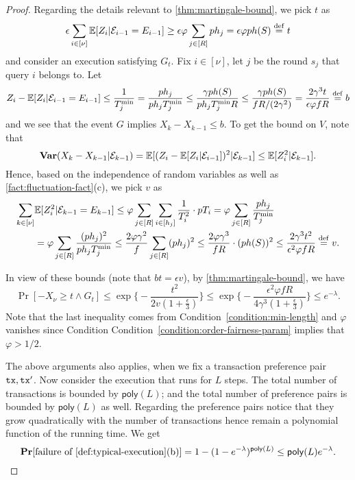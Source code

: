 \begin{proof}
    Regarding the details relevant to \cref{thm:martingale-bound}, we pick $t$ as
    \[ \epsilon \sum_{i \in [\nu]} \mathbb{E} [Z_i | \mathcal{E}_{i - 1} = E_{i - 1}] \ge \epsilon \varphi \sum_{j \in [R]} p h_j = \epsilon \varphi p h(S) \overset{\mathrm{def}}{=} t \]
    and consider an execution satisfying $G_t$.
    Fix $i \in [\nu]$, let $j$ be the round $s_j$ that query $i$ belongs to.
    Let
    \[ Z_i - \mathbb{E} [Z_i | \mathcal{E}_{i - 1} = E_{i - 1}] \le \frac{1}{T^{\min}_j} = \frac{p h_j}{p h_j T^{\min}_j} \le \frac{\gamma p h(S)}{p h_j T^{\min}_j R} \le \frac{\gamma p h(S)}{fR / (2\gamma^2)} = \frac{2\gamma^3 t}{\epsilon \varphi f R} \overset{\mathrm{def}}{=} b \]
    and we see that the event $G$ implies $X_k - X_{k - 1} \le b$.
    To get the bound on $V$, note that
    \[  \mathbf{Var} (X_k - X_{k - 1} | \mathcal{E}_{k - 1}) = \mathbb{E}[(Z_i - \mathbb{E} [Z_i | \mathcal{E}_{i - 1}])^2 | \mathcal{E}_{k - 1}] \le \mathbb{E} [Z^2_i | \mathcal{E}_{k  -1}]. \]
    Hence, based on the independence of random variables as well as \cref{fact:fluctuation-fact}(c), we pick $v$ as
    \begin{align*}
        \sum_{k \in [\nu]} & \mathbb{E} [Z^2_i | \mathcal{E}_{k - 1} = E_{k - 1}] \le \varphi \sum_{j \in [R]} \sum_{i \in [h_j]} \frac{1}{T_i^2} \cdot p T_i
        = \varphi \sum_{j \in [R]} \frac{p h_j}{T^{\min}_j}
        \\
                           & = \varphi \sum_{j \in [R]} \frac{(p h_j)^2}{p h_j T^{\min}_j}  \le \frac{2\varphi \gamma^2}{f} \sum_{j \in [R]} (p h_j)^2 \le \frac{2\varphi \gamma^3}{f R} \cdot (p h(S))^2 \le
        \frac{2 \gamma^3 t^2}{\epsilon^2 \varphi f R} \overset{\mathrm{def}}{=} v.
    \end{align*}

    In view of these bounds (note that $bt = \epsilon v$), by \cref{thm:martingale-bound}, we have
    \[ \Pr [-X_\nu \ge t \wedge G_t] \le \exp \Big\{ -\frac{t^2}{2v (1 + \frac{\epsilon}{3})} \Big\} \le \exp \Big\{ -\frac{\epsilon^2 \varphi f R}{4\gamma^3 (1 + \frac{\epsilon}{3})} \Big\} \le e^{-\lambda}. \]
    Note that the last inequality comes from Condition~\eqref{condition:min-length} and $\varphi$ vanishes since Condition Condition~\eqref{condition:order-fairness-param} implies that $\varphi > 1/2$.

    The above arguments also applies, when we fix a transaction preference pair $\mathtt{tx}, \mathtt{tx}'$.
    Now consider the execution that runs for $L$ steps.
    The total number of transactions is bounded by $\mathsf{poly}(L)$; and the total number of preference pairs is bounded by $\mathsf{poly}(L)$ as well.
    Regarding the preference pairs notice that they grow quadratically with the number of transactions hence remain a polynomial function of the running time.
    We get
    \begin{equation} \label{eq:error-prob-ds-lower-bound}
        \Pr[\text{failure of \cref{def:typical-execution}(b)}] = 1 - (1 - e^{-\lambda})^{\mathsf{poly}(L)} \le \mathsf{poly}(L) e^{-\lambda}.
    \end{equation}


\end{proof}
